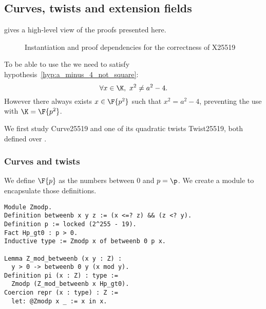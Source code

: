 \subsection{Curves, twists and extension fields}
\label{subsec:curve_twist_fields}

 gives a high-level view of the proofs presented here.

\begin{figure}[h]
  \centering
  
  \caption{Instantiation and proof dependencies for the correctness of X25519}
  \label{tikz:ProofHighLevel2}
\end{figure}

To be able to use the  we need to satisfy
hypothesis~\ref{hyp:a_minus_4_not_square}:%
$$\forall x \in \K,\ x^2 \neq a^2-4.$$
However there always exists $x \in \F{p^2}$ such that $x^2 = a^2-4$,
preventing the use 
with $\K = \F{p^2}$.

\begin{sloppypar}
We first study Curve25519 and one of its quadratic twists Twist25519,
both defined over .
\end{sloppypar}

\subsubsection{Curves and twists}
\label{subsec:Zmodp}

We define $\F{p}$ as the numbers between $0$ and $p = \p$.
We create a  module to encapsulate those definitions.
\begin{lstlisting}[language=Coq]
Module Zmodp.
Definition betweenb x y z := (x <=? z) && (z <? y).
Definition p := locked (2^255 - 19).
Fact Hp_gt0 : p > 0.
Inductive type := Zmodp x of betweenb 0 p x.

Lemma Z_mod_betweenb (x y : Z) :
  y > 0 -> betweenb 0 y (x mod y).
Definition pi (x : Z) : type :=
  Zmodp (Z_mod_betweenb x Hp_gt0).
Coercion repr (x : type) : Z :=
  let: @Zmodp x _ := x in x.
\end{lstlisting}

